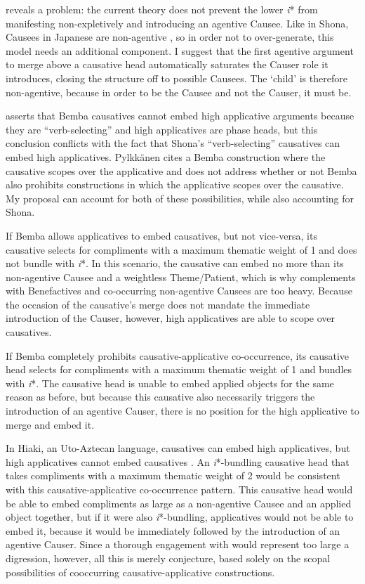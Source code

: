 \documentclass[output=paper,modfonts,nonflat,colorlinks,citecolor=brown]{langsci/langscibook}
\begin{document}
 reveals a problem: the current theory does not prevent the lower \textit{i}* from manifesting non-expletively and introducing an agentive Causee. Like in Shona, Causees in Japanese are non-agentive \citep[107]{Pylkkänen2008}, so in order not to over-generate, this model needs an additional component. I suggest that the first agentive argument to merge above a causative head automatically saturates the Causer role it introduces, closing the structure off to possible Causees. The ‘child’ is therefore non-agentive, because in order to be the Causee and not the Causer, it must be.



\citet{Pylkkänen2008} asserts that Bemba causatives cannot embed high applicative arguments because they are “verb-selecting” and high applicatives are phase heads, but this conclusion conflicts with the fact that Shona’s “verb-selecting” causatives can embed high applicatives. Pylkkänen cites a Bemba construction where the causative scopes over the applicative and does not address whether or not Bemba also prohibits constructions in which the applicative scopes over the causative. My proposal can account for both of these possibilities, while also accounting for Shona.



If Bemba allows applicatives to embed causatives, but not vice-versa, its causative selects for compliments with a maximum thematic weight of 1 and does not bundle with \textit{i}*. In this scenario, the causative can embed no more than its non-agentive Causee and a weightless Theme/Patient, which is why complements with Benefactives and co-occurring non-agentive Causees are too heavy. Because the occasion of the causative’s merge does not mandate the immediate introduction of the Causer, however, high applicatives are able to scope over causatives.



If Bemba completely prohibits causative-applicative co-occurrence, its causative head selects for compliments with a maximum thematic weight of 1 and bundles with \textit{i}*. The causative head is unable to embed applied objects for the same reason as before, but because this causative also necessarily triggers the introduction of an agentive Causer, there is no position for the high applicative to merge and embed it.



In Hiaki, an Uto-Aztecan language, causatives can embed high applicatives, but high applicatives cannot embed causatives \citep{Jung2014}. An \textit{i}*-bundling causative head that takes compliments with a maximum thematic weight of 2 would be consistent with this causative-applicative co-occurrence pattern. This causative head would be able to embed compliments as large as a non-agentive Causee and an applied object together, but if it were also \textit{i}*-bundling, applicatives would not be able to embed it, because it would be immediately followed by the introduction of an agentive Causer. Since a thorough engagement with \citet{Jung2014} would represent too large a digression, however, all this is merely conjecture, based solely on the scopal possibilities of cooccurring causative-applicative constructions.
\end{document}
